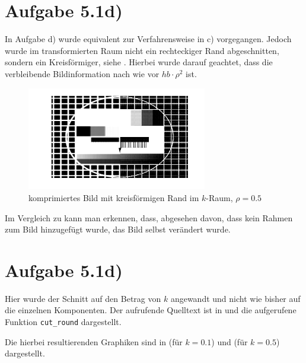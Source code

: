 \section*{Aufgabe 5.1d)}

In Aufgabe d) wurde equivalent zur Verfahrensweise in c) vorgegangen.
Jedoch wurde im transformierten Raum nicht ein rechteckiger Rand abgeschnitten,
sondern ein Kreisförmiger, siehe . Hierbei wurde darauf geachtet, dass die verbleibende
Bildinformation nach wie vor $hb\cdot ρ^2$ ist.



\begin{figure}[htb]
\centering
  \includegraphics[width=0.7\textwidth,keepaspectratio]{../tmp/eins_c_0_5}
  \caption{komprimiertes Bild mit kreisförmigen Rand im $k$-Raum, $ρ=0.5$}
  \label{fig:1d5}
\end{figure}

Im Vergleich zu  kann man erkennen, dass, abgesehen davon, dass kein
Rahmen zum Bild hinzugefügt wurde, das Bild selbst verändert wurde. 

\section*{Aufgabe 5.1d)}
Hier wurde der Schnitt auf den Betrag von $k$ angewandt und nicht wie bisher
auf die einzelnen Komponenten. Der aufrufende Quelltext ist in  und 
die aufgerufene Funktion \texttt{cut\_round} dargestellt.




Die hierbei resultierenden Graphiken sind in  (für $k = 0.1$) und
 (für $k=0.5$) dargestellt.

